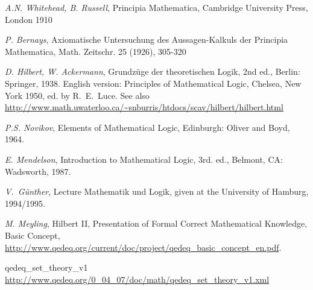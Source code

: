 \documentclass[a4paper,german,10pt,twoside]{book}
\theoremstyle{definition}
\theoremstyle{remark}
\begin{document}

\backmatter

\begin{thebibliography}{99}
 \emph{A.N. Whitehead, B. Russell}, Principia Mathematica, Cambridge University Press, London 1910

 \emph{P. Bernays}, Axiomatische Untersuchung des Aussagen-Kalkuls der {\glqq Principia Mathematica\grqq}, Math. Zeitschr. 25 (1926), 305-320

 \emph{D. Hilbert, W. Ackermann}, Grundz{\"u}ge der theoretischen Logik, 2nd ed., Berlin: Springer, 1938. English version: Principles of Mathematical Logic, Chelsea, New York 1950, ed. by R.~E.~Luce.
See also \url{http://www.math.uwaterloo.ca/~snburris/htdocs/scav/hilbert/hilbert.html}

 \emph{P.S. Novikov}, Elements of Mathematical Logic, Edinburgh: Oliver and Boyd, 1964.

 \emph{E. Mendelson}, Introduction to Mathematical Logic, 3rd. ed., Belmont, CA: Wadsworth, 1987.

 \emph{V.~G{\"u}nther}, Lecture {\glqq Mathematik und Logik\grqq}, given at the University of Hamburg, 1994/1995.

 \emph{M. Meyling}, Hilbert II, Presentation of Formal Correct Mathematical Knowledge, Basic Concept,
\url{http://www.qedeq.org/current/doc/project/qedeq_basic_concept_en.pdf}.



 qedeq\_set\_theory\_v1 \url{http://www.qedeq.org/0_04_07/doc/math/qedeq_set_theory_v1.xml}


\end{thebibliography}
 \printindex
\end{document}
